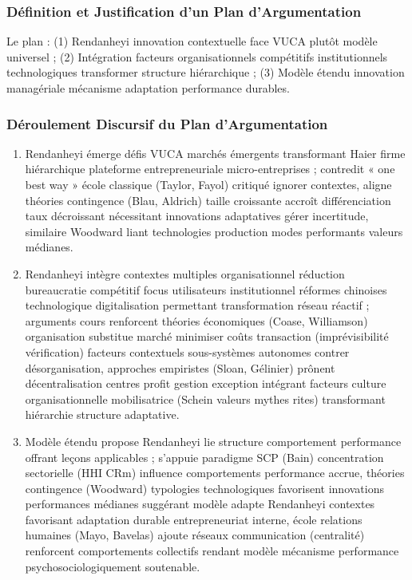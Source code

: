 \documentclass[11pt]{rapportECL}
\begin{document}
\subsubsection{Définition et Justification d’un Plan d’Argumentation}
Le plan : (1) Rendanheyi innovation contextuelle face VUCA plutôt modèle universel ; (2) Intégration facteurs organisationnels compétitifs institutionnels technologiques transformer structure hiérarchique ; (3) Modèle étendu innovation managériale mécanisme adaptation performance durables.

\subsubsection{Déroulement Discursif du Plan d’Argumentation}
\begin{enumerate}
\item Rendanheyi émerge défis VUCA marchés émergents transformant Haier firme hiérarchique plateforme entrepreneuriale micro-entreprises ; contredit « one best way » école classique (Taylor, Fayol) critiqué ignorer contextes, aligne théories contingence (Blau, Aldrich) taille croissante accroît différenciation taux décroissant nécessitant innovations adaptatives gérer incertitude, similaire Woodward liant technologies production modes performants valeurs médianes.
\item Rendanheyi intègre contextes multiples organisationnel réduction bureaucratie compétitif focus utilisateurs institutionnel réformes chinoises technologique digitalisation permettant transformation réseau réactif ; arguments cours renforcent théories économiques (Coase, Williamson) organisation substitue marché minimiser coûts transaction (imprévisibilité vérification) facteurs contextuels sous-systèmes autonomes contrer désorganisation, approches empiristes (Sloan, Gélinier) prônent décentralisation centres profit gestion exception intégrant facteurs culture organisationnelle mobilisatrice (Schein valeurs mythes rites) transformant hiérarchie structure adaptative.
\item Modèle étendu propose Rendanheyi lie structure comportement performance offrant leçons applicables ; s’appuie paradigme SCP (Bain) concentration sectorielle (HHI CRm) influence comportements performance accrue, théories contingence (Woodward) typologies technologiques favorisent innovations performances médianes suggérant modèle adapte Rendanheyi contextes favorisant adaptation durable entrepreneuriat interne, école relations humaines (Mayo, Bavelas) ajoute réseaux communication (centralité) renforcent comportements collectifs rendant modèle mécanisme performance psychosociologiquement soutenable.
\end{enumerate}
\end{document}
